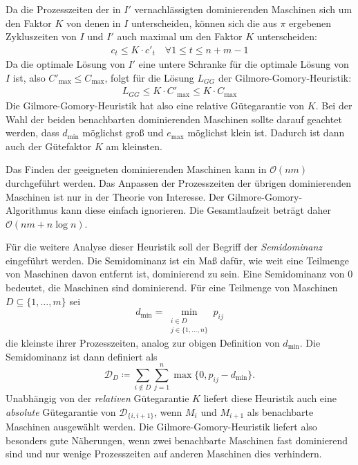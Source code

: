 \documentclass{scrreprt}
\begin{document}
Da die Prozesszeiten der in $I'$ vernachlässigten dominierenden Maschinen sich um den Faktor $K$ von denen in $I$ unterscheiden, 
können sich die aus $\pi$ ergebenen Zykluszeiten von $I$ und $I'$ auch maximal um den Faktor $K$ unterscheiden:
\begin{align}
    c_t \leq K\cdot c'_t \quad \forall 1\leq t\leq n+m-1
\end{align}
Da die optimale Lösung von $I'$ eine untere Schranke für die optimale Lösung von $I$ ist, also $C'_{\max} \leq C_{\max}$, folgt für die Lösung $L_{GG}$ der
Gilmore-Gomory-Heuristik:
\begin{align}
    L_{GG} \leq K\cdot C'_{\max} \leq K\cdot C_{\max}
\end{align}
Die Gilmore-Gomory-Heuristik hat also eine relative Gütegarantie von $K$.
Bei der Wahl der beiden benachbarten dominierenden Maschinen sollte darauf geachtet werden, dass $d_{\min}$ möglichst groß und $e_{\max}$ möglichst klein ist.
Dadurch ist dann auch der Gütefaktor $K$ am kleinsten.

Das Finden der geeigneten dominierenden Maschinen kann in $\mathcal{O}(nm)$ durchgeführt werden. 
Das Anpassen der Prozesszeiten der übrigen dominierenden Maschinen ist nur in der Theorie von Interesse.
Der Gilmore-Gomory-Algorithmus kann diese einfach ignorieren.
Die Gesamtlaufzeit beträgt daher $\mathcal{O}(nm + n\log n)$.

Für die weitere Analyse dieser Heuristik soll der Begriff der \textit{Semidominanz} eingeführt werden.
Die Semidominanz ist ein Maß dafür, wie weit eine Teilmenge von Maschinen davon entfernt ist, dominierend zu sein.
Eine Semidominanz von $0$ bedeutet, die Maschinen sind dominierend.
Für eine Teilmenge von Maschinen $D\subseteq\{1,\ldots,m\}$ sei 
\[d_{\min} = \min_{\substack{i\in D \\ j\in\{1,\ldots,n\}}} p_{ij}\] 
die kleinste ihrer Prozesszeiten, analog zur obigen Definition von $d_{\min}$.
Die Semidominanz ist dann definiert als
\[\mathcal{D}_{D} \coloneqq \sum_{i\not\in D} \sum_{j=1}^n \max\{0,p_{ij}-d_{\min}\} \text{.}\]
Unabhängig von der \textit{relativen} Gütegarantie $K$ liefert diese Heuristik auch eine \textit{absolute} Gütegarantie von $\mathcal{D}_{\{i,i+1\}}$, 
wenn $M_i$ und $M_{i+1}$ als benachbarte Maschinen ausgewählt werden.
Die Gilmore-Gomory-Heuristik liefert also besonders gute Näherungen, wenn zwei benachbarte Maschinen fast dominierend sind und nur wenige Prozesszeiten auf anderen
Maschinen dies verhindern.
\end{document}
